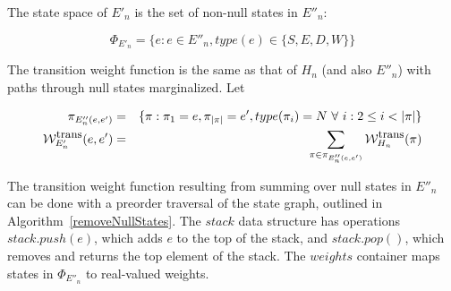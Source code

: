 \documentclass{article}
\newcommand\States{\Phi}
\newcommand\statesof[1]{\States_{#1}}
\newcommand\weight{{\cal W}}
\newcommand\weightfunof[1]{\weight_{#1}}
\newcommand\transweightfun[1]{\weightfunof{#1}^{\mbox{\small trans}}}
\begin{document}
The state space of $E'_n$ is the set of non-null states in $E''_n$:

\[
\statesof{E'_n} = \{ e : e \in E''_n, type(e) \in \{S,E,D,W\} \}
\]

The transition weight function is the same as that of $H_n$ (and also $E''_n$) with paths through null states marginalized.
Let 

\begin{eqnarray*}
\pi_{ {E''_n}(e,e')} &  =  & \{  \pi: \pi_1 =e, \pi_{|\pi|}=e', type(\pi_i) = N\ \forall\ i: 2 \leq i < |\pi| \} \\
 \transweightfun{E'_n}(e,e') & = & \sum_{\pi \in \pi_{E''_n(e,e') }} \transweightfun{H_n}(\pi) 
\end{eqnarray*}

The transition weight function resulting from summing over null states in $E''_n$ can be done with a preorder traversal of the state graph, outlined in Algorithm~\ref{removeNullStates}.   The $stack$ data structure has operations $stack.push(e)$, which adds $e$ to the top of the stack, and $stack.pop()$, which removes and returns the top element of the stack.  The $weights$ container maps states in $\statesof{E''_n}$ to real-valued weights.  
\end{document}
